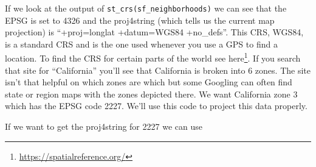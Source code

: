 \documentclass[
]{krantz}
\renewcommand{\href}[2]{#2\footnote{\url{#1}}}
\begin{document}
If we look at the output of \texttt{st\_crs(sf\_neighborhoods)} we can see that the EPSG is set to 4326 and the proj4string (which tells us the current map projection) is ``+proj=longlat +datum=WGS84 +no\_defs''. This CRS, WGS84, is a standard CRS and is the one used whenever you use a GPS to find a location. To find the CRS for certain parts of the world see \href{https://spatialreference.org/}{here}. If you search that site for ``California'' you'll see that California is broken into 6 zones. The site isn't that helpful on which zones are which but some Googling can often find state or region maps with the zones depicted there. We want California zone 3 which has the EPSG code 2227. We'll use this code to project this data properly.

If we want to get the proj4string for 2227 we can use
\end{document}
